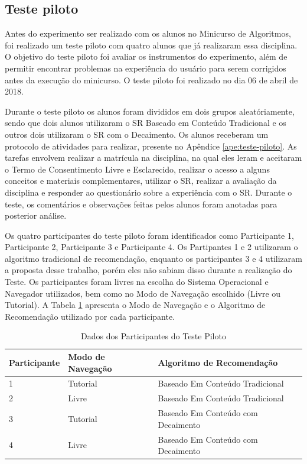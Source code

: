 \subsection{Teste piloto}\label{section:planejamento-teste-piloto}

Antes do experimento ser realizado com os alunos no Minicurso de Algoritmos, foi realizado um teste piloto com
quatro alunos que já realizaram essa disciplina. O objetivo do teste piloto foi avaliar os instrumentos do experimento,
além de permitir encontrar problemas na experiência do usuário para serem corrigidos antes da execução do minicurso. O teste piloto
foi realizado no dia 06 de abril de 2018.

Durante o teste piloto os alunos foram divididos em dois grupos aleatóriamente, sendo que dois alunos utilizaram o SR
Baseado em Conteúdo Tradicional e os outros dois utilizaram o SR com o Decaimento. Os alunos receberam
um protocolo de atividades para realizar, presente no Apêndice \ref{ape:teste-piloto}. As tarefas envolvem
realizar a matrícula na disciplina, na qual eles leram e aceitaram o Termo de Consentimento Livre e Esclarecido, realizar
o acesso a alguns conceitos e materiais complementares, utilizar o SR, realizar a avaliação da disciplina e responder
ao questionário sobre a experiência com o SR. Durante o teste, os comentários e observações feitas pelos alunos foram
anotadas para posterior análise.

Os quatro participantes do teste piloto foram identificados como Participante 1, Participante 2,
Participante 3 e Participante 4. Os Partipantes 1 e 2 utilizaram o algoritmo tradicional de recomendação, enquanto os
participantes 3 e 4 utilizaram a proposta desse trabalho, porém eles não sabiam disso durante a realização do Teste. Os
participantes foram livres na escolha do Sistema Operacional e Navegador utilizados, bem como no Modo de Navegação
escolhido (Livre ou Tutorial). A Tabela \ref{tab:participantes-teste-piloto} apresenta o Modo de Navegação e o Algoritmo
de Recomendação utilizado por cada participante.

\begin{table}[h]
\footnotesize
\caption[Dados dos Participantes do Teste Piloto]{Dados dos Participantes do Teste Piloto}
\label{tab:participantes-teste-piloto}
\centering
\begin{tabular}{|p{2cm}|p{3.5cm}|p{6.5cm}|}
  \hline
  \textbf{Participante} & \textbf{Modo de Navegação} & \textbf{Algoritmo de Recomendação} \\
  \hline
  1 & Tutorial & Baseado Em Conteúdo Tradicional \\
  \hline
  2 & Livre & Baseado Em Conteúdo Tradicional \\
  \hline
  3 & Tutorial & Baseado Em Conteúdo com Decaimento \\
  \hline
  4 & Livre & Baseado Em Conteúdo com Decaimento \\
  \hline
\end{tabular}
\end{table}

